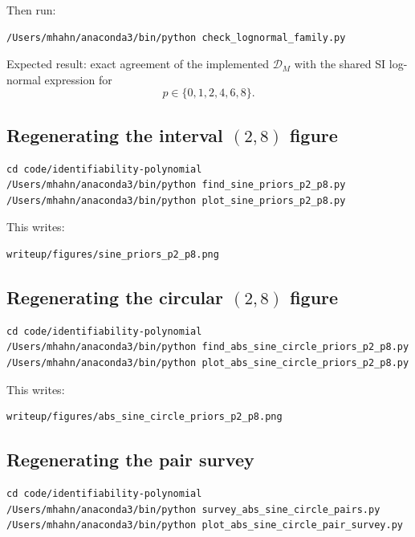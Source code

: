 \documentclass[11pt]{article}
\begin{document}
Then run:
\begin{Verbatim}[fontsize=\small]
/Users/mhahn/anaconda3/bin/python check_lognormal_family.py
\end{Verbatim}

Expected result: exact agreement of the implemented $\mathcal{D}_M$ with the shared SI log-normal expression for
\[
p \in \{0,1,2,4,6,8\}.
\]

\subsection{Regenerating the interval $(2,8)$ figure}

\begin{Verbatim}[fontsize=\small]
cd code/identifiability-polynomial
/Users/mhahn/anaconda3/bin/python find_sine_priors_p2_p8.py
/Users/mhahn/anaconda3/bin/python plot_sine_priors_p2_p8.py
\end{Verbatim}

This writes:
\begin{Verbatim}[fontsize=\small]
writeup/figures/sine_priors_p2_p8.png
\end{Verbatim}

\subsection{Regenerating the circular $(2,8)$ figure}

\begin{Verbatim}[fontsize=\small]
cd code/identifiability-polynomial
/Users/mhahn/anaconda3/bin/python find_abs_sine_circle_priors_p2_p8.py
/Users/mhahn/anaconda3/bin/python plot_abs_sine_circle_priors_p2_p8.py
\end{Verbatim}

This writes:
\begin{Verbatim}[fontsize=\small]
writeup/figures/abs_sine_circle_priors_p2_p8.png
\end{Verbatim}

\subsection{Regenerating the pair survey}

\begin{Verbatim}[fontsize=\small]
cd code/identifiability-polynomial
/Users/mhahn/anaconda3/bin/python survey_abs_sine_circle_pairs.py
/Users/mhahn/anaconda3/bin/python plot_abs_sine_circle_pair_survey.py
\end{Verbatim}
\end{document}
